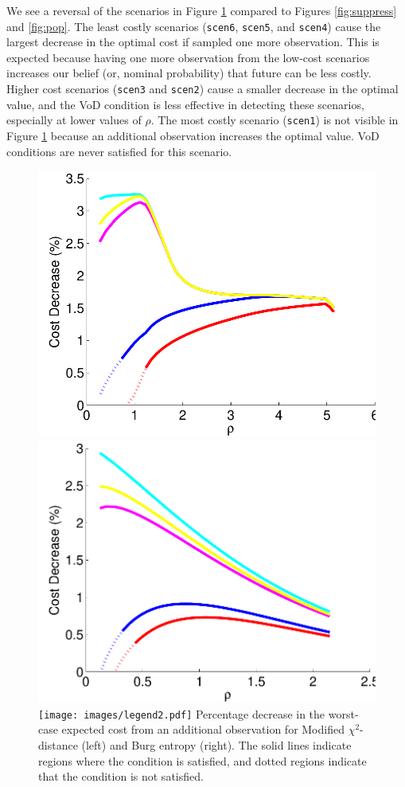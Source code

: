 \documentclass[opre,nonblindrev]{informs3} %
\begin{document}
We see a reversal of the scenarios in Figure \ref{fig:value} compared to Figures \ref{fig:suppress} and \ref{fig:pop}. 
The least costly scenarios (\texttt{scen6}, \texttt{scen5}, and \texttt{scen4}) cause the largest decrease in the optimal cost if sampled one more observation.
This is expected because having one more observation from the low-cost scenarios increases our belief (or, nominal probability) that future can be less costly.  
Higher cost scenarios (\texttt{scen3} and \texttt{scen2})  cause a smaller decrease in the optimal value, and the VoD condition is less effective in detecting these scenarios, especially at lower values of $\rho$. 
The most costly scenario (\texttt{scen1}) is not visible in Figure \ref{fig:value} because an additional observation increases the optimal value.
VoD conditions are never satisfied for this scenario.


\begin{figure}
	\FIGURE
	{%
		\includegraphics*[width=.40\textwidth]{images/mchi2_decrease_condition}%
		\includegraphics*[width=.40\textwidth]{images/burg_decrease_condition}%
		\texttt{[image: images/legend2.pdf]}
	}
	{
		Percentage decrease in the worst-case expected cost from an additional observation for Modified $\chi^2$-distance (left) and Burg entropy (right).
		The solid lines indicate regions where the condition is satisfied, and dotted regions indicate that the condition is not satisfied.
		\label{fig:value}
	}
	{}
\end{figure}
\end{document}
